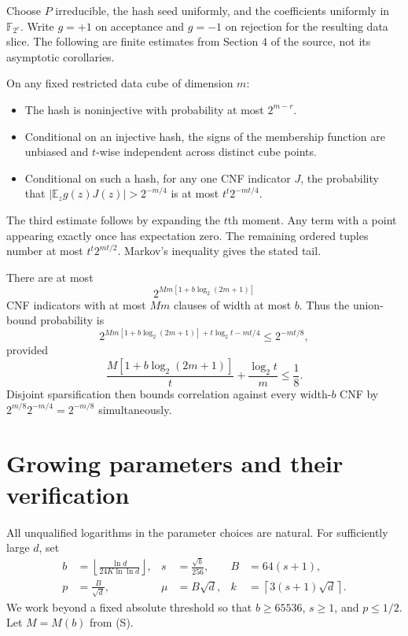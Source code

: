 \documentclass[11pt]{article}
\newcommand{\E}{\mathbb E}
\begin{document}
Choose $P$ irreducible, the hash seed uniformly, and the coefficients
uniformly in $\mathbb F_{2^r}$. Write $g=+1$ on acceptance and $g=-1$
on rejection for the resulting data slice. The following are finite estimates from
Section 4 of the source, not its asymptotic corollaries.

On any fixed restricted data cube of dimension $m$:
\begin{itemize}
\item The hash is noninjective with probability at most $2^{m-r}$.
\item Conditional on an injective hash, the signs of the membership
function are unbiased and $t$-wise independent across distinct cube points.
\item Conditional on such a hash, for any one CNF indicator $J$, the probability that
$|\E_z g(z)J(z)|>2^{-m/4}$ is at most $t^t2^{-mt/4}$.
\end{itemize}
The third estimate follows by expanding the $t$th moment. Any term with
a point appearing exactly once has expectation zero. The remaining
ordered tuples number at most $t^t2^{mt/2}$. Markov's inequality gives
the stated tail.

There are at most
\[
 2^{M m[1+b\log_2(2m+1)]}
\]
CNF indicators with at most $Mm$ clauses of width at most $b$.
Thus the union-bound probability is
\[
 2^{Mm[1+b\log_2(2m+1)]+t\log_2t-mt/4}\le2^{-mt/8},
\]
provided
\begin{equation}\label{eq:union}
 \frac{M[1+b\log_2(2m+1)]}{t}
       +\frac{\log_2t}{m}\le\frac18.
\end{equation}
Disjoint sparsification then bounds correlation against every width-$b$
CNF by $2^{m/8}2^{-m/4}=2^{-m/8}$ simultaneously.

\section{Growing parameters and their verification}

All unqualified logarithms in the parameter choices are natural.
For sufficiently large $d$, set
\begin{align*}
 b&=\left\lfloor\frac{\ln d}{24K\ln\ln d}\right\rfloor,&
 s&=\frac{\sqrt b}{256},& B&=64(s+1),\\
 p&=\frac{B}{\sqrt d},& \mu&=B\sqrt d,&
 k&=\left\lceil3(s+1)\sqrt d\right\rceil.
\end{align*}
We work beyond a fixed absolute threshold so that $b\ge65536$, $s\ge1$,
and $p\le1/2$. Let $M=M(b)$ from (S).
\end{document}
